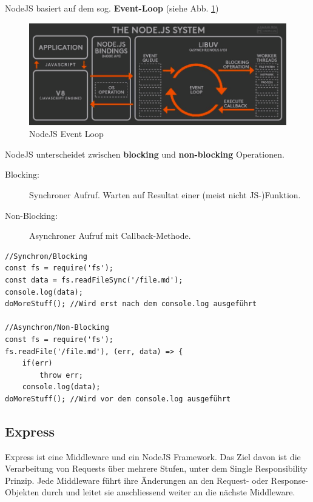 \documentclass[a4paper, 11pt]{article}
\begin{document}
\newpage

\noindent NodeJS basiert auf dem sog. \textbf{Event-Loop} (siehe Abb. \ref{fig:nodejseventloop})
\begin{figure}[htb]
	\centering
	\includegraphics[keepaspectratio=true,height=12\baselineskip]{event_loop.PNG}
	\caption{NodeJS Event Loop}
	\label{fig:nodejseventloop}
\end{figure}
\vspace{10px}

\noindent NodeJS unterscheidet zwischen \textbf{blocking} und \textbf{non-blocking} Operationen.

\begin{description}
	\item[Blocking: ] Synchroner Aufruf. Warten auf Resultat einer (meist nicht JS-)Funktion.
	\item[Non-Blocking: ] Asynchroner Aufruf mit Callback-Methode.
\end{description}

\begin{lstlisting}
//Synchron/Blocking
const fs = require('fs');
const data = fs.readFileSync('/file.md');
console.log(data);
doMoreStuff(); //Wird erst nach dem console.log ausgeführt

//Asynchron/Non-Blocking
const fs = require('fs');
fs.readFile('/file.md'), (err, data) => {
	if(err)
		throw err;
	console.log(data);
doMoreStuff(); //Wird vor dem console.log ausgeführt
\end{lstlisting}

\subsection{Express}
Express ist eine Middleware und ein NodeJS Framework. Das Ziel davon ist die Verarbeitung von Requests über mehrere Stufen, unter dem Single Responsibility Prinzip. Jede Middleware führt ihre Änderungen an den Request- oder Response-Objekten durch und leitet sie anschliessend weiter an die nächste Middleware.
\end{document}
